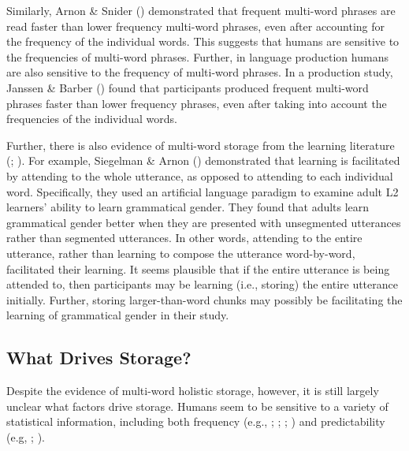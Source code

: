 \documentclass[
  12pt,
  letterpaper,
]{scrreprt}
\begin{document}
Similarly, Arnon \& Snider
() demonstrated that
frequent multi-word phrases are read faster than lower frequency
multi-word phrases, even after accounting for the frequency of the
individual words. This suggests that humans are sensitive to the
frequencies of multi-word phrases. Further, in language production
humans are also sensitive to the frequency of multi-word phrases. In a
production study, Janssen \& Barber
() found that
participants produced frequent multi-word phrases faster than lower
frequency phrases, even after taking into account the frequencies of the
individual words.

Further, there is also evidence of multi-word storage from the learning
literature (;
). For example, Siegelman \& Arnon
() demonstrated
that learning is facilitated by attending to the whole utterance, as
opposed to attending to each individual word. Specifically, they used an
artificial language paradigm to examine adult L2 learners' ability to
learn grammatical gender. They found that adults learn grammatical
gender better when they are presented with unsegmented utterances rather
than segmented utterances. In other words, attending to the entire
utterance, rather than learning to compose the utterance word-by-word,
facilitated their learning. It seems plausible that if the entire
utterance is being attended to, then participants may be learning (i.e.,
storing) the entire utterance initially. Further, storing
larger-than-word chunks may possibly be facilitating the learning of
grammatical gender in their study.

\subsection{What Drives Storage?}\label{what-drives-storage}

Despite the evidence of multi-word holistic storage, however, it is
still largely unclear what factors drive storage. Humans seem to be
sensitive to a variety of statistical information, including both
frequency (e.g., ;
;
; ) and predictability (e.g,
;
).
\end{document}
